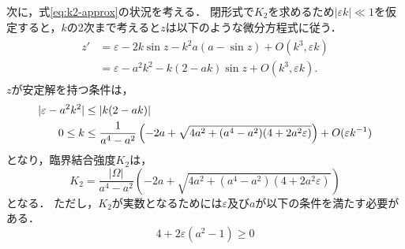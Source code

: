 \documentclass[../main]{subfiles}
\begin{document}
    次に，式\eqref{eq:k2-approx}の状況を考える．
    閉形式で$K_2$を求めるため$|\varepsilon k|\ll 1$を仮定すると，$k$の2次まで考えると$z$は以下のような微分方程式に従う．
    \begin{align}
        \label{eq:z-k2-approx}
        \begin{split}
            z'&=\varepsilon-2k\sin z-k^2a(a-\sin  z)+O(k^3,\varepsilon k)\\
            &=\varepsilon-a^2k^2-k(2-ak)\sin z+O(k^3,\varepsilon k).
        \end{split}
    \end{align}
    $z$が安定解を持つ条件は，
    \begin{align}
        |\varepsilon-a^2k^2|&\leq |k(2-ak)|\notag\\
        0\leq k&\leq \frac{1}{a^4-a^2}\left(-2a+\sqrt{4a^2+(a^4-a^2)(4+2a^2\varepsilon)}\right)+O(\varepsilon k^{-1})
    \end{align}
    となり，臨界結合強度$K_2$は，
    \begin{equation}
        \label{eq:K2-approx}
        K_2=\frac{|\Omega|}{a^4-a^2}\left(-2a+\sqrt{4a^2+(a^4-a^2)(4+2a^2\varepsilon)}\right)
    \end{equation}
    となる．
    ただし，$K_2$が実数となるためには$\varepsilon$及び$a$が以下の条件を満たす必要がある．
    \begin{equation}
        4+2\varepsilon(a^2-1)\geq 0
    \end{equation}
\end{document}
